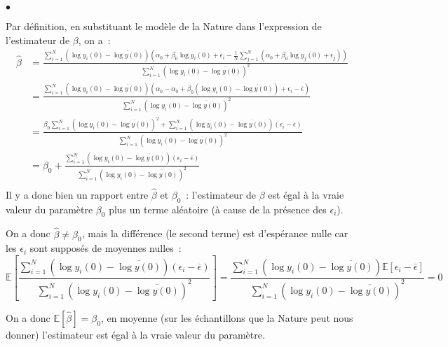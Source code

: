 \documentclass[10pt,notheorems]{beamer}
\theoremstyle{plain}
\theoremstyle{definition} %
\begin{document}
\begin{notes}
\begin{list}{$\bullet$}{}
    \item Par définition, en substituant le modèle de la Nature dans
      l'expression de l'estimateur de $\beta$, on a~:
      \[
        \begin{split}
          \hat\beta &= \frac{\sum_{i=1}^N\left(\log y_i(0)-\overline{\log y(0)}\right)\left(\alpha_0 + \beta_0 \log y_i(0) + \epsilon_i-\frac{1}{N}\sum_{j=1}^{N}\left(\alpha_0 + \beta_0 \log y_j(0) + \epsilon_j\right)\right)}
                      {\sum_{i=1}^N\left(\log y_i(0)-\overline{\log y(0)}\right)^2}\\[12pt]
                    &= \frac{\sum_{i=1}^N\left(\log y_i(0)-\overline{\log y(0)}\right)\left(\alpha_0-\alpha_0 + \beta_0 \left(\log y_i(0)-\overline{\log y(0)}\right) + \epsilon_i-\overline{\epsilon}\right)}
                      {\sum_{i=1}^N\left(\log y_i(0)-\overline{\log y(0)}\right)^2}\\[12pt]
                    &= \frac{\beta_0\sum_{i=1}^N\left(\log y_i(0)-\overline{\log y(0)}\right)^2+\sum_{i=1}^N\left(\log y_i(0)-\overline{\log y(0)}\right)\left(\epsilon_i-\overline{\epsilon}\right)}
                      {\sum_{i=1}^N\left(\log y_i(0)-\overline{\log y(0)}\right)^2}\\[12pt]
                    &= \beta_0 + \frac{\sum_{i=1}^N\left(\log y_i(0)-\overline{\log y(0)}\right)\left(\epsilon_i-\overline{\epsilon}\right)}
                      {\sum_{i=1}^N\left(\log y_i(0)-\overline{\log y(0)}\right)^2}\\
        \end{split}
      \]
      Il y a donc bien un rapport entre $\hat\beta$ et $\beta_0$~: l'estimateur
      de $\beta$ est égal à la vraie valeur du paramètre $\beta_0$ plus un terme
      aléatoire (à cause de la présence des $\epsilon_i$).

    \item On a donc $\hat\beta \neq \beta_0$, mais la différence (le second
      terme) est d'espérance nulle car les $\epsilon_i$ sont supposés de
      moyennes nulles~:
      \[
        \mathbb E\left[\frac{\sum_{i=1}^N\left(\log y_i(0)-\overline{\log y(0)}\right)\left(\epsilon_i-\overline{\epsilon}\right)}
                      {\sum_{i=1}^N\left(\log y_i(0)-\overline{\log y(0)}\right)^2}\right] = \frac{\sum_{i=1}^N\left(\log y_i(0)-\overline{\log y(0)}\right)\mathbb E \left[\epsilon_i-\overline{\epsilon}\right]}
                      {\sum_{i=1}^N\left(\log y_i(0)-\overline{\log y(0)}\right)^2} = 0
      \]

    \item On a donc $\mathbb E [\hat\beta] = \beta_0$, en moyenne (sur les échantillons que la Nature peut nous donner) l'estimateur est égal à la vraie valeur du paramètre.\newline


\end{list}
\end{notes}
\end{document}

